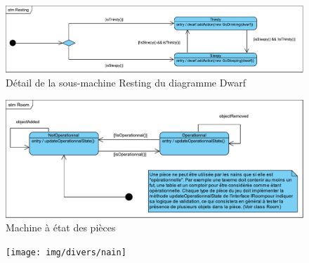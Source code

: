 \documentclass[a4paper]{report}
\begin{document}
\begin{figure}[bh!]
    \center
    \includegraphics[width=15cm]{img/stm/Resting}
    \caption{Détail de la sous-machine Resting du diagramme Dwarf}
		\label{}
\end{figure}

\begin{figure}[bh!]
    \center
    \includegraphics[width=15cm]{img/stm/Room}
    \caption{Machine à état des pièces}
		\label{}
\end{figure}

\clearpage
\begin{figure}[H!]
    \center
    \texttt{[image: img/divers/nain]}
\end{figure}
\end{document}

